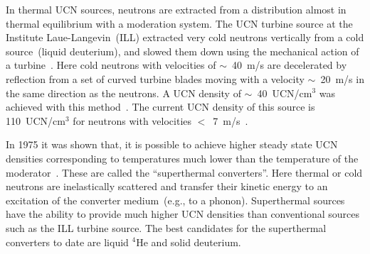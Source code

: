 In thermal UCN sources, neutrons are extracted from a distribution
almost in thermal equilibrium with a moderation system. The UCN
turbine source at the Institute Laue-Langevin~(ILL) extracted very
cold neutrons vertically from a cold source~(liquid deuterium), and
slowed them down using the mechanical action of a
turbine~\cite{Steyerl1986,Steyerl1975}. Here cold neutrons with
velocities of $\sim$~40~m/s are decelerated by reflection from a set
of curved turbine blades moving with a velocity $\sim$~20~m/s in the
same direction as the neutrons. A UCN density of $\sim$~40~UCN/cm$^3$
was achieved with this method~\cite{ucnbook,Albert_talk}. The current
UCN density of this source is 110~UCN/cm$^3$ for neutrons with
velocities $<$~7~m/s~\cite{Steyerl1986}.


In 1975 it was shown that, it is possible to achieve higher steady
state UCN densities corresponding to temperatures much lower than the
temperature of the moderator~\cite{Golub75}. These are called the
``superthermal converters''. Here thermal or cold neutrons are
inelastically scattered and transfer their kinetic energy to an
excitation of the converter medium~(e.g., to a phonon).  Superthermal
sources have the ability to provide much higher UCN densities than
conventional sources such as the ILL turbine source. The best
candidates for the superthermal converters to date are liquid $^4$He
and solid deuterium.





